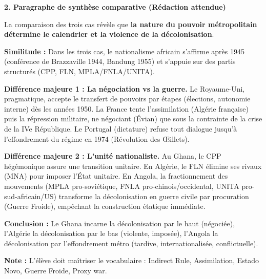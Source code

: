 \documentclass[11pt]{article}
\newcommand{\cle}[1]{{\popxbold\color{popdark}#1}}
\begin{document}
\begin{exoresolu}
\textbf{2. Paragraphe de synthèse comparative (Rédaction attendue)}

La comparaison des trois cas révèle que \textbf{la nature du pouvoir métropolitain détermine le calendrier et la violence de la décolonisation}.
\par \textbf{Similitude :} Dans les trois cas, le nationalisme africain s'affirme après 1945 (conférence de Brazzaville 1944, Bandung 1955) et s'appuie sur des partis structurés (CPP, FLN, MPLA/FNLA/UNITA).
\par \textbf{Différence majeure 1 : La négociation vs la guerre.} Le Royaume-Uni, pragmatique, accepte le \cle{transfert de pouvoirs} par étapes (élections, autonomie interne) dès les années 1950. La France tente l'\cle{assimilation} (Algérie française) puis la répression militaire, ne négociant (Évian) que sous la contrainte de la crise de la IVe République. Le Portugal (dictature) refuse tout dialogue jusqu'à l'effondrement du régime en 1974 (\cle{Révolution des Œillets}).
\par \textbf{Différence majeure 2 : L'unité nationaliste.} Au Ghana, le CPP hégémonique assure une transition unitaire. En Algérie, le FLN élimine ses rivaux (MNA) pour imposer l'État unitaire. En Angola, la \cle{fractionnement} des mouvements (MPLA pro-soviétique, FNLA pro-chinois/occidental, UNITA pro-sud-africain/US) transforme la décolonisation en \cle{guerre civile par procuration} (Guerre Froide), empêchant la construction étatique immédiate.
\par \textbf{Conclusion :} Le Ghana incarne la \cle{décolonisation par le haut} (négociée), l'Algérie la \cle{décolonisation par le bas} (violente, imposée), l'Angola la \cle{décolonisation par l'effondrement métro} (tardive, internationalisée, conflictuelle).

\par \textbf{Note :} L'élève doit maîtriser le vocabulaire : \cle{Indirect Rule}, \cle{Assimilation}, \cle{Estado Novo}, \cle{Guerre Froide}, \cle{Proxy war}.
\end{exoresolu}
\end{document}
